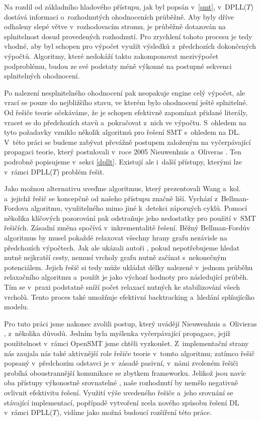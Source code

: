 Na rozdíl od základního hladového přístupu, jak byl popsán v~\ref{smt}, v~DPLL($T$) dostává \Solver informaci o~rozhodnutých ohodnoceních průběžně. Aby byly dříve odhaleny slepé větve v~rozhodovacím stromu, \Solver je průběžně dotazován na splnitelnost dosud provedených rozhodnutí. Pro zrychlení tohoto procesu je tedy vhodné, aby byl schopen pro výpočet využít výsledků z~předchozích dokončených výpočtů. Algoritmy, které nedokáží takto zakomponovat mezivýpočet podproblému, budou ze své podstaty méně výkonné na postupné sekvenci splnitelných ohodnocení.

Po nalezení nesplnitelného ohodnocení pak neopakuje engine celý výpočet, ale vrací se pouze do nejbližšího stavu, ve kterém bylo ohodnocení ještě splnitelné. Od řešiče teorie očekáváme, že je schopen efektivně zapomínat přidané literály, vracet se do předchozích stavů a~pokračovat z~nich ve výpočtu. %
S~ohledem na tyto požadavky vzniklo několik algoritmů pro řešení SMT s~ohledem na DL. V~této práci se budeme zabývat převážně postupem založeným na vyčerpávající propagaci teorie, který postulovali v~roce 2005 Nieuwenhuis a~Oliveras \cite{Nieuwenhuis05}. Ten podrobně popisujeme v~sekci \ref{dpllt}. Existují ale i~další přístupy, kterými lze v~rámci DPLL($T$) problém řešit.

Jako možnou alternativu uveďme algoritmus, který prezentovali Wang a~kol. \cite{Wang05} a~jejichž řešič se koncepčně od našeho přístupu značně liší. Vychází z~Bellman-Fordova algoritmu, využitelného mimo jiné k~detekci záporných cyklů. Pomocí několika klíčových pozorování pak odstraňuje jeho nedostatky pro použití v~SMT řešičích. Zásadní změna spočívá v~inkrementalitě řešení. Běžný Bellman-Fordův algoritmus by musel pokaždé relaxovat všechny hrany grafu nezávisle na předchozích výpočtech. Jak ale ukázali autoři \cite{Wang05}, pokud nepotřebujeme hledat nutně nejkratší cesty, nemusí vrcholy grafu nutně začínat s~nekonečným potenciálem. Jejich řešič si tedy může ukládat délky nalezené v~jednom průběhu relaxačního algoritmu a~použít je jako výchozí hodnoty pro následující průběh. Tím se v~praxi podstatně sníží počet relaxací nutných ke stabilizování všech vrcholů. Tento proces také umožňuje efektivní backtracking a~hledání splňujícího modelu.

Pro tuto práci jsme nakonec zvolili postup, který uvádějí Nieuwenhuis a~Olivieras \cite{Nieuwenhuis05}, z~několika důvodů. Jedním byla myšlenka vyčerpávající propagace, jejíž použitelnost v~rámci OpenSMT jsme chtěli vyzkoušet. Z~implementační strany nás zaujala nás také aktivnější role řešiče teorie v~tomto algoritmu; zatímco řešič popsaný v~předchozím odstavci je v~zásadě pasivní, v~námi zvoleném řešiči probíhá oboustrannější komunikace se zbytkem frameworku. Jelikož jsou navíc oba přístupy výkonostně srovnatelné \cite{Wang05}, naše rozhodnutí by nemělo negativně ovlivnit efektivitu řešení. Využití výše uvedeného řešiče a~jeho srovnání se stávající implementací, popřípadě vytvoření zcela nového způsobu řešení DL v~rámci DPLL($T$), vidíme jako možná budoucí rozšíření této práce.
